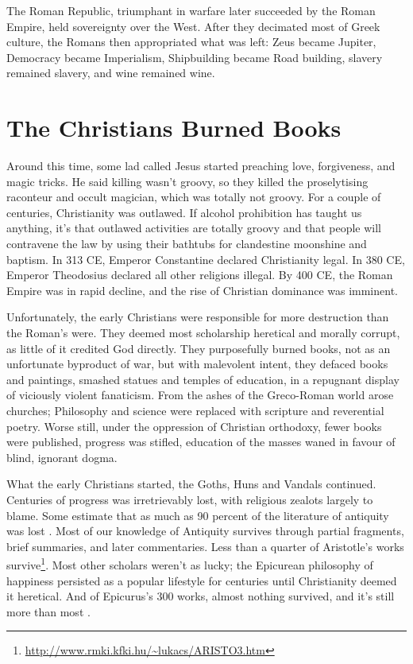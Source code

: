 The Roman Republic, triumphant in warfare later succeeded by the Roman Empire, held sovereignty over the West. After they decimated most of Greek culture, the Romans then appropriated what was left: Zeus became Jupiter, Democracy became Imperialism, Shipbuilding became Road building, slavery remained slavery, and wine remained wine.

\section{The Christians Burned Books}

Around this time, some lad called Jesus started preaching love, forgiveness, and magic tricks. He said killing wasn't groovy, so they killed the proselytising raconteur and occult magician, which was totally not groovy. For a couple of centuries, Christianity was outlawed. If alcohol prohibition has taught us anything, it's that outlawed activities are totally groovy and that people will contravene the law by using their bathtubs for clandestine moonshine and baptism. In 313 CE, Emperor Constantine declared Christianity legal. In 380 CE, Emperor Theodosius declared all other religions illegal. By 400 CE, the Roman Empire was in rapid decline, and the rise of Christian dominance was imminent.

Unfortunately, the early Christians were responsible for more destruction than the Roman's were. They deemed most scholarship heretical and morally corrupt, as little of it credited God directly. They purposefully burned books, not as an unfortunate byproduct of war, but with malevolent intent, they defaced books and paintings, smashed statues and temples of education, in a repugnant display of viciously violent fanaticism. From the ashes of the Greco-Roman world arose churches; Philosophy and science were replaced with scripture and reverential poetry. Worse still, under the oppression of Christian orthodoxy, fewer books were published, progress was stifled, education of the masses waned in favour of blind, ignorant dogma.

What the early Christians started, the Goths, Huns and Vandals continued. Centuries of progress was irretrievably lost, with religious zealots largely to blame. Some estimate that as much as 90 percent of the literature of antiquity was lost \cite{rohmann2016christianity}. Most of our knowledge of Antiquity survives through partial fragments, brief summaries, and later commentaries. Less than a quarter of Aristotle's works survive\footnote{\url{http://www.rmki.kfki.hu/~lukacs/ARISTO3.htm}}. Most other scholars weren't as lucky; the Epicurean philosophy of happiness persisted as a popular lifestyle for centuries until Christianity deemed it heretical. And of Epicurus's 300 works, almost nothing survived, and it's still more than most \cite{kenny2010new}. 

